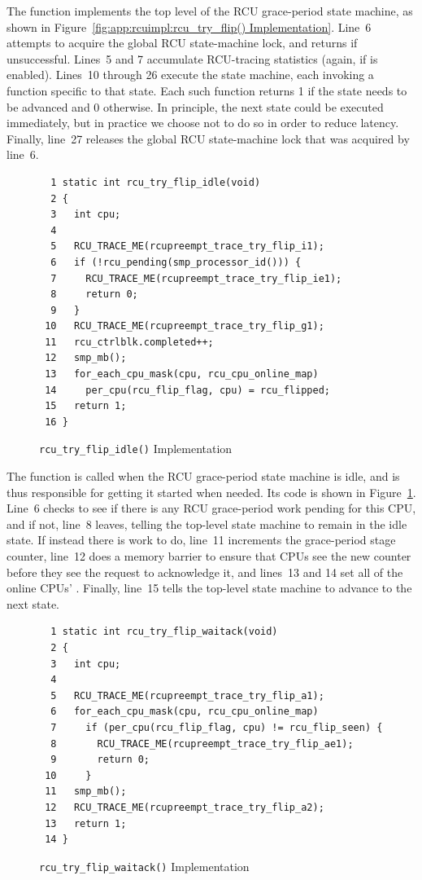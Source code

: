 The  function implements the top level of
the RCU grace-period state machine, as shown in
Figure~\ref{fig:app:rcuimpl:rcu_try_flip() Implementation}.
Line~6 attempts to acquire the global RCU state-machine lock,
and returns if unsuccessful.
Lines~5 and 7 accumulate RCU-tracing statistics (again, if
 is enabled).
Lines~10 through 26 execute the state machine,
each invoking a function specific to that state.
Each such function returns 1 if the state needs to be advanced and
0 otherwise.
In principle, the next state could be executed immediately,
but in practice we choose not to do so in order to reduce latency.
Finally, line~27 releases the global RCU state-machine lock
that was acquired by line~6.

\begin{figure}[tbp]
{ \scriptsize
\begin{verbatim}
  1 static int rcu_try_flip_idle(void)
  2 {
  3   int cpu;
  4
  5   RCU_TRACE_ME(rcupreempt_trace_try_flip_i1);
  6   if (!rcu_pending(smp_processor_id())) {
  7     RCU_TRACE_ME(rcupreempt_trace_try_flip_ie1);
  8     return 0;
  9   }
 10   RCU_TRACE_ME(rcupreempt_trace_try_flip_g1);
 11   rcu_ctrlblk.completed++;
 12   smp_mb();
 13   for_each_cpu_mask(cpu, rcu_cpu_online_map)
 14     per_cpu(rcu_flip_flag, cpu) = rcu_flipped;
 15   return 1;
 16 }
\end{verbatim}
}
\caption{{\tt rcu\_try\_flip\_idle()} Implementation}
\label{fig:app:rcuimpl:rcu_try_flip_idle() Implementation}
\end{figure}

The  function is called when the
RCU grace-period state machine is idle, and is thus responsible for
getting it started when needed.
Its code is shown in
Figure~\ref{fig:app:rcuimpl:rcu_try_flip_idle() Implementation}.
Line~6 checks to see if there is any RCU grace-period work
pending for this CPU, and if not, line~8 leaves, telling
the top-level state machine to remain in the idle state.
If instead there is work to do, line~11 increments the
grace-period stage counter, line~12 does a memory barrier
to ensure that CPUs see the new counter before they see the
request to acknowledge it, and lines~13 and 14 set all of
the online CPUs' .
Finally, line~15 tells the top-level state machine to
advance to the next state.

\begin{figure}[tbp]
{ \scriptsize
\begin{verbatim}
  1 static int rcu_try_flip_waitack(void)
  2 {
  3   int cpu;
  4
  5   RCU_TRACE_ME(rcupreempt_trace_try_flip_a1);
  6   for_each_cpu_mask(cpu, rcu_cpu_online_map)
  7     if (per_cpu(rcu_flip_flag, cpu) != rcu_flip_seen) {
  8       RCU_TRACE_ME(rcupreempt_trace_try_flip_ae1);
  9       return 0;
 10     }
 11   smp_mb();
 12   RCU_TRACE_ME(rcupreempt_trace_try_flip_a2);
 13   return 1;
 14 }
\end{verbatim}
}
\caption{{\tt rcu\_try\_flip\_waitack()} Implementation}
\label{fig:app:rcuimpl:rcu_try_flip_waitack() Implementation}
\end{figure}

